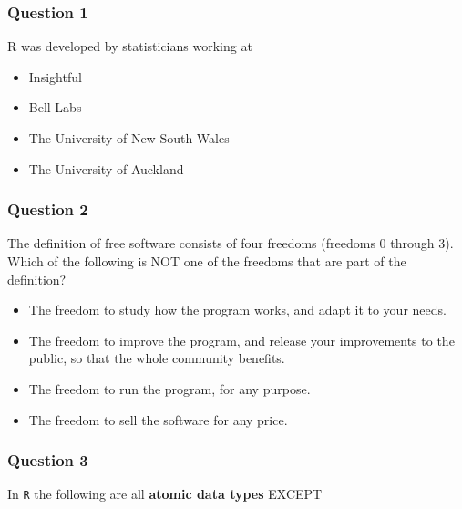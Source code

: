 
\begin{frame}
\frametitle{Question 1}
\Large
R was developed by statisticians working at
\begin{itemize}
\item Insightful
\item Bell Labs
\item The University of New South Wales
\item The University of Auckland
\end{itemize}
\end{frame}
\begin{frame}
\frametitle{Question 2}
\Large
The definition of free software consists of four freedoms (freedoms 0 through 3). \\ Which of the following is NOT one of the freedoms that are part of the definition?
\begin{itemize}
\item The freedom to study how the program works, and adapt it to your needs.
\item The freedom to improve the program, and release your improvements to the public, so that the whole community benefits.
\item The freedom to run the program, for any purpose.
\item The freedom to sell the software for any price.
\end{itemize}
\end{frame}
\begin{frame}
\frametitle{Question 3}
\Large
In \texttt{R} the following are all \textbf{atomic data types} EXCEPT
\end{frame}
